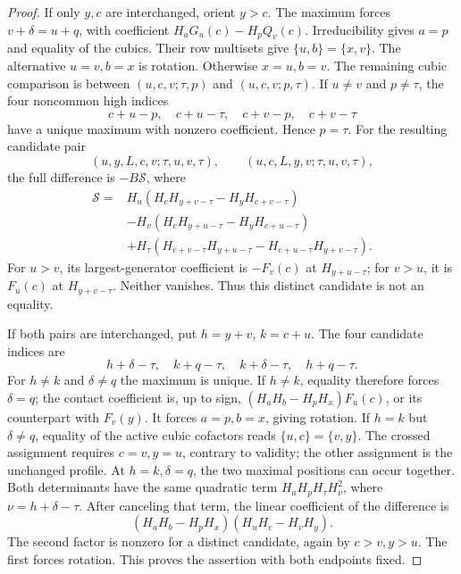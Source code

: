 \documentclass[11pt,a4paper]{amsart}
\numberwithin{equation}{section}
\theoremstyle{plain}
\theoremstyle{definition}
\begin{document}
\begin{proof}
If only \(y,c\) are interchanged, orient \(y>c\).  The maximum
forces \(v+\delta=u+q\), with coefficient
\(H_aG_u(c)-H_pQ_v(c)\).  Irreducibility gives \(a=p\) and equality
of the cubics.  Their row multisets give \(\{u,b\}=\{x,v\}\).  
The alternative \(u=v,b=x\) is rotation.  Otherwise \(x=u,b=v\).  
The remaining cubic comparison is between
\((u,c,v;\tau,p)\) and \((u,c,v;p,\tau)\).  If \(u\ne v\) and
\(p\ne\tau\), the four noncommon high indices
\[
 c+u-p,\quad c+u-\tau,\quad c+v-p,\quad c+v-\tau
\]
have a unique maximum with nonzero coefficient.  Hence \(p=\tau\).  
For the resulting candidate pair
\[
 (u,y,L,c,v;\tau,u,v,\tau),\qquad
 (u,c,L,y,v;\tau,u,v,\tau),
\]
the full difference is \(-B\mathcal S\), where
\begin{equation}\label{eq:five-survivor}
 \begin{aligned}
 \mathcal S={}&H_u(H_cH_{y+v-\tau}-H_yH_{c+v-\tau})\\
 &-H_v(H_cH_{y+u-\tau}-H_yH_{c+u-\tau})\\
 &+H_\tau(H_{c+v-\tau}H_{y+u-\tau}
             -H_{c+u-\tau}H_{y+v-\tau}).
 \end{aligned}
\end{equation}
For \(u>v\), its largest-generator coefficient is \(-F_v(c)\) at
\(H_{y+u-\tau}\); for \(v>u\), it is \(F_u(c)\) at
\(H_{y+v-\tau}\).  Neither vanishes.  Thus this distinct candidate is
not an equality.  

If both pairs are interchanged, put \(h=y+v\), \(k=c+u\).  The four
candidate indices are
\[
 h+\delta-\tau,\quad k+q-\tau,\quad
 k+\delta-\tau,\quad h+q-\tau.
\]
For \(h\ne k\) and \(\delta\ne q\) the maximum is unique.  If
\(h\ne k\), equality therefore forces \(\delta=q\); the contact
coefficient is, up to sign,
\((H_aH_b-H_pH_x)F_u(c)\), or its counterpart with \(F_v(y)\).  
It forces \(a=p,b=x\), giving rotation.  If \(h=k\) but
\(\delta\ne q\), equality of the active cubic cofactors reads
\(\{u,c\}=\{v,y\}\).  The crossed assignment requires \(c=v,y=u\),
contrary to validity; the other assignment is the unchanged profile.  
At \(h=k,\delta=q\), the two maximal positions can occur together.  
Both determinants have the same quadratic term
\(H_aH_pH_\tau H_\nu^2\), where \(\nu=h+\delta-\tau\).  After
canceling that term, the linear coefficient of the difference is
\[
 (H_aH_b-H_pH_x)(H_uH_c-H_vH_y).
\]
The second factor is nonzero for a distinct candidate, again by
\(c>v,y>u\).  The first forces rotation.  This proves the assertion
with both endpoints fixed.  


\end{proof}
\end{document}
